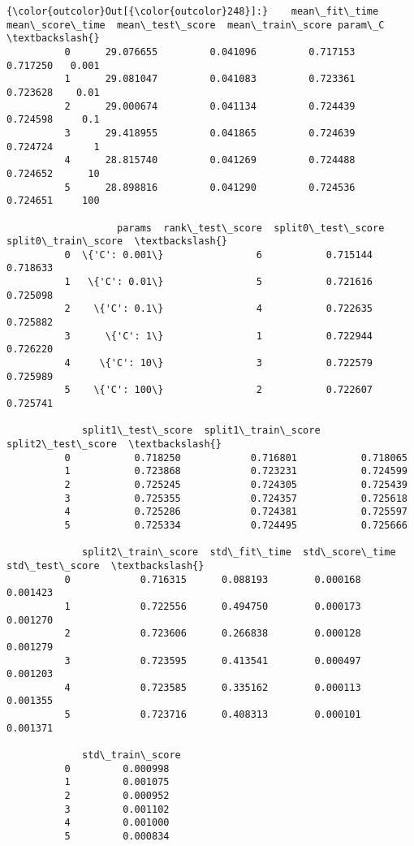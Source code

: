\documentclass[11pt]{article}
\begin{document}
            \begin{Verbatim}[commandchars=\\\{\}]
{\color{outcolor}Out[{\color{outcolor}248}]:}    mean\_fit\_time  mean\_score\_time  mean\_test\_score  mean\_train\_score param\_C  \textbackslash{}
          0      29.076655         0.041096         0.717153          0.717250   0.001   
          1      29.081047         0.041083         0.723361          0.723628    0.01   
          2      29.000674         0.041134         0.724439          0.724598     0.1   
          3      29.418955         0.041865         0.724639          0.724724       1   
          4      28.815740         0.041269         0.724488          0.724652      10   
          5      28.898816         0.041290         0.724536          0.724651     100   
          
                   params  rank\_test\_score  split0\_test\_score  split0\_train\_score  \textbackslash{}
          0  \{'C': 0.001\}                6           0.715144            0.718633   
          1   \{'C': 0.01\}                5           0.721616            0.725098   
          2    \{'C': 0.1\}                4           0.722635            0.725882   
          3      \{'C': 1\}                1           0.722944            0.726220   
          4     \{'C': 10\}                3           0.722579            0.725989   
          5    \{'C': 100\}                2           0.722607            0.725741   
          
             split1\_test\_score  split1\_train\_score  split2\_test\_score  \textbackslash{}
          0           0.718250            0.716801           0.718065   
          1           0.723868            0.723231           0.724599   
          2           0.725245            0.724305           0.725439   
          3           0.725355            0.724357           0.725618   
          4           0.725286            0.724381           0.725597   
          5           0.725334            0.724495           0.725666   
          
             split2\_train\_score  std\_fit\_time  std\_score\_time  std\_test\_score  \textbackslash{}
          0            0.716315      0.088193        0.000168        0.001423   
          1            0.722556      0.494750        0.000173        0.001270   
          2            0.723606      0.266838        0.000128        0.001279   
          3            0.723595      0.413541        0.000497        0.001203   
          4            0.723585      0.335162        0.000113        0.001355   
          5            0.723716      0.408313        0.000101        0.001371   
          
             std\_train\_score  
          0         0.000998  
          1         0.001075  
          2         0.000952  
          3         0.001102  
          4         0.001000  
          5         0.000834  
\end{Verbatim}
        
\end{document}
